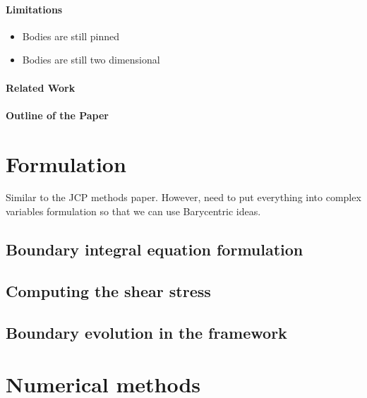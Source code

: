 \documentclass[preprint, 10pt]{elsarticle}
\begin{document}
\paragraph{Limitations}
\begin{itemize}
  \item Bodies are still pinned
  \item Bodies are still two dimensional
\end{itemize}

\paragraph{Related Work}

\paragraph{Outline of the Paper}

\section{Formulation}
\label{s:formulation}
Similar to the JCP methods paper.  However, need to put everything into
complex variables formulation so that we can use Barycentric ideas.


\subsection{Boundary integral equation formulation} 
\label{sec:bies}

\subsection{Computing the shear stress}
\label{sec:shearStressLP}

\subsection{Boundary evolution in the {\thL} framework} 
\label{sec:thetaL}


\section{Numerical methods}
\label{s:method}
\end{document}

